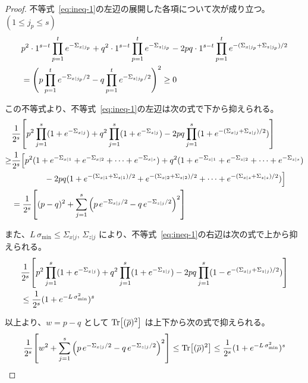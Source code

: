 \begin{proof}
    不等式~\eqref{eq:ineq-1}の左辺の展開した各項について次が成り立つ。$(1 \leq j_p \leq s)$
    \begin{align}
        &p^2 \cdot 1^{s-t} \prod_{p=1}^{t}e^{-\Sigma_{x|j_p}}
        + q^2 \cdot 1^{s-t} \prod_{p=1}^{t}e^{-\Sigma_{z|j_p}}
        - 2pq \cdot 1^{s-t} \prod_{p=1}^{t}e^{-(\Sigma_{x|j_p}+\Sigma_{z|j_p})/2}\\
        &=
        \qty(p\prod_{p=1}^{t}e^{-\Sigma_{x|j_p}/2} - q\prod_{p=1}^{t}e^{-\Sigma_{z|j_p}/2})^2
        \geq 0
    \end{align}
    
    この不等式より、不等式~\eqref{eq:ineq-1}の左辺は次の式で下から抑えられる。
    \begin{align}
        &\frac{1}{2^s}
        \qty[
            p^2\prod_{j=1}^s(1 + e^{-\Sigma_{x|j}})
            + q^2\prod_{j=1}^s(1 + e^{-\Sigma_{z|j}})
            - 2pq\prod_{j=1}^s(1 + e^{-(\Sigma_{x|j}+\Sigma_{z|j})/2})
        ]\\
        \geq
        &\frac{1}{2^s}
        \Big[
            p^2(1 + e^{-\Sigma_{x|1}} + e^{-\Sigma_{x|2}} + \cdots + e^{-\Sigma_{x|s}})
            + q^2(1 + e^{-\Sigma_{z|1}} + e^{-\Sigma_{z|2}} + \cdots + e^{-\Sigma_{z|s}})\nonumber\\
            &\qquad\qquad- 2pq(1 + e^{-(\Sigma_{x|1}+\Sigma_{z|1})/2} + e^{-(\Sigma_{x|2}+\Sigma_{z|2})/2} + \cdots + e^{-(\Sigma_{x|s}+\Sigma_{z|s})/2})
        \Big]\\
        &=
        \frac{1}{2^s}
        \qty[(p-q)^2 + \sum_{j=1}^s \qty(p\,e^{-\Sigma_{x|j}/2} - q\,e^{-\Sigma_{z|j}/2})^2]
    \end{align}
    
    また、$L\,\sigma_{\min} \leq \Sigma_{x|j},\, \Sigma_{z|j}$ により、不等式~\eqref{eq:ineq-1}の右辺は次の式で上から抑えられる。
    \begin{align}
        &\frac{1}{2^s}
        \qty[
            p^2\prod_{j=1}^s(1 + e^{-\Sigma_{x|j}})
            + q^2\prod_{j=1}^s(1 + e^{-\Sigma_{z|j}})
            - 2pq\prod_{j=1}^s(1 - e^{-(\Sigma_{x|j}+\Sigma_{z|j})/2})
        ]\\
        &\leq
        \frac{1}{2^s} (1 + e^{-L\,\sigma_{\min}^2})^s
    \end{align}
    
    以上より、$w = p-q$ として $\Tr[(\overline{\rho})^2]$ は上下から次の式で抑えられる。
    \begin{align}
        \frac{1}{2^s}
        \qty[w^2 + \sum_{j=1}^s \qty(p\,e^{-\Sigma_{x|j}/2} - q\,e^{-\Sigma_{z|j}/2})^2]
        \leq \Tr[(\overline{\rho})^2]
        \leq \frac{1}{2^s} (1 + e^{-L\,\sigma_{\min}^2})^s
    \end{align}
\end{proof}



